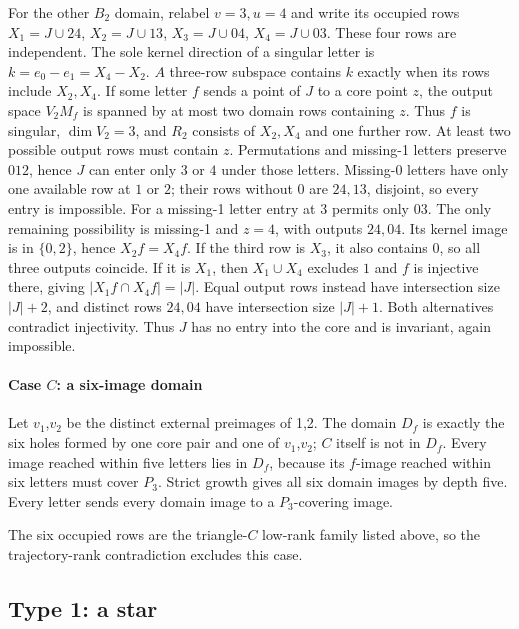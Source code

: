 \documentclass[11pt]{article}
\theoremstyle{definition}
\theoremstyle{plain}
\begin{document}
For the other \(B_{2}\) domain, relabel \(v=3,u=4\) and write its
occupied rows \(X_1=J\cup24\), \(X_2=J\cup13\), \(X_3=J\cup04\),
\(X_4=J\cup03\). These four rows are independent. The sole kernel
direction of a singular letter is \(k=e_0-e_1=X_4-X_2\). \(A\)
three-row subspace contains \(k\) exactly when its rows include
\(X_2,X_4\). If some letter \(f\) sends a point of \(J\) to a
core point \(z\), the output space \(V_2M_f\) is spanned by at most two
domain rows containing \(z\). Thus \(f\) is singular, \(\dim V_2=3\),
and \(R_2\) consists of \(X_2,X_4\) and one further row. At least two
possible output rows must contain \(z\). Permutations and missing-1
letters preserve \(012\), hence \(J\) can enter only \(3\) or \(4\)
under those letters. Missing-0 letters have only one available row at
\(1\) or \(2\); their rows without \(0\) are \(24,13\), disjoint, so
every entry is impossible. For a missing-1 letter entry at \(3\)
permits only \(03\). The only remaining possibility is missing-1 and
\(z=4\), with outputs \(24,04\). Its kernel image is in \(\{0,2\}\),
hence \(X_2f=X_4f\). If the third row is \(X_3\), it also contains
\(0\), so all three outputs coincide. If it is \(X_1\), then
\(X_1\cup X_4\) excludes \(1\) and \(f\) is injective there, giving
\(|X_1f\cap X_4f|=|J|\). Equal output rows instead have intersection
size \(|J|+2\), and distinct rows \(24,04\) have intersection size
\(|J|+1\). Both alternatives contradict injectivity. Thus \(J\) has no
entry into the core and is invariant, again impossible.

\paragraph{Case \(C\): a six-image
domain}\label{case-c-a-six-image-domain}

Let \(v_1\),\(v_2\) be the distinct external preimages of 1,2. The
domain \(D_f\) is exactly the six holes formed by one core pair and one
of \(v_1\),\(v_2\); \(C\) itself is not in \(D_f\). Every image reached
within five letters lies in \(D_f\), because its \(f\)-image reached
within six letters must cover \(P_{3}\). Strict growth gives all six
domain images by depth five. Every letter sends every domain image to
a \(P_{3}\)-covering image.

The six occupied rows are the triangle-\(C\) low-rank family listed
above, so the trajectory-rank contradiction excludes this case.

\subsection{Type 1: a star}\label{type-1-is-incompatible-with-strong-connectivity}
\end{document}
